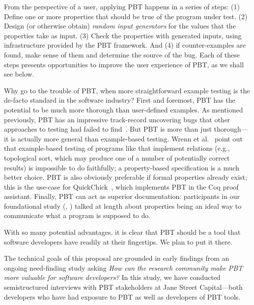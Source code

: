 From the perspective of a user, applying PBT happens in a series of steps:
(1) Define one or more properties that should be true of the program under
  test.
(2) Design (or otherwise obtain) {\em random input generators} for the
  values that the properties take as input.
(3) Check the properties with generated inputs, using infrastructure
  provided by the PBT framework.
And (4) if counter-examples are found, make sense of them and determine the
  source of the bug.
Each of these steps presents opportunities to improve the user experience of
PBT, as we shall see below.

\smallskip

Why go to the trouble of PBT, when more straightforward example testing is the
de-facto standard in the software industry? First and foremost, PBT has the
potential to be much more thorough than user-defined examples. As mentioned
previously, PBT has an impressive track-record uncovering bugs that other
approaches to testing had failed to find~\cite{arts2006testing,
hughes2014mysteries, Bornholt2021, arts2015testing, hughes2016experiences}. But
PBT is more than just thorough---it is actually more general than example-based
testing. Wrenn et al.~\cite{wrenn2021using} point out that example-based testing
of programs like that implement relations (e.g., topological sort, which may
produce one of a number of potentially correct results) is impossible to do
faithfully; a property-based specification is a much better choice. PBT is also
obviously preferable if formal properties already exist; this is the use-case
for QuickChick~\cite{paraskevopoulou_foundational_2015}, which implements PBT in
the Coq proof assistant. Finally, PBT can act as superior documentation:
participants in our foundational study (, )
talked at length about properties being an ideal way to communicate what a
program is supposed to do.

With so many potential advantages, it is clear that PBT should be a tool that
software developers have readily at their fingertips. We plan to put it there.

\iflater{}
  \fi

\label{sec:motivation}
%
The technical goals of this proposal are grounded in early
findings from an ongoing need-finding study asking {\em How can the
  research community make PBT more valuable for software developers?}
%
\iflater {}\fi
%
%
In this study, we have conducted semistructured interviews with
PBT stakeholders at Jane
Street Capital---both
developers who have had exposure to PBT as
well as developers of PBT tools.

